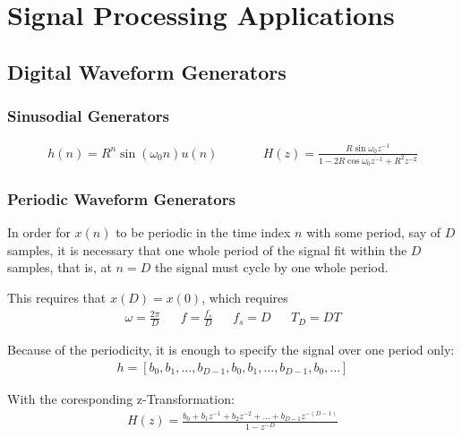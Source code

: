 \section{Signal Processing Applications}
\subsection{Digital Waveform Generators}
\subsubsection{Sinusodial Generators}
\begin{align*}
	h(n) = R^n \sin(\omega_0 n)u(n) \qquad
	&& H(z) = \frac{R \sin \omega_0 z^{-1}}{1-2R\cos \omega_0 z^{-1} + R^2 z^{-2}}
\end{align*}

\subsubsection{Periodic Waveform Generators}
In order for $x(n)$ to be periodic in the time index $n$ with some period, say of $D$ samples,
it is necessary that one whole period of the signal fit within the $D$ samples, that is,
at $n = D$ the signal must cycle by one whole period.

This requires that $x(D) = x(0)$, which requires
\begin{align*}
	\omega = \frac{2\pi}{D} && f = \frac{f_s}{D} && f_s = D && T_D = DT
\end{align*}


Because of the periodicity, it is enough to specify the signal over one period only:
\begin{align*}
	h = [b_0, b_1, \ldots, b_{D-1}, b_0, b_1, \ldots, b_{D-1}, b_0, \ldots]
\end{align*}

With the coresponding z-Transformation:
\begin{align*}
	H(z) = \frac{b_0 + b_1 z^{-1} + b_2 z^{-2} + \ldots + b_{D-1} z^{-(D-1)}}{1 - z^{-D}}
\end{align*}

